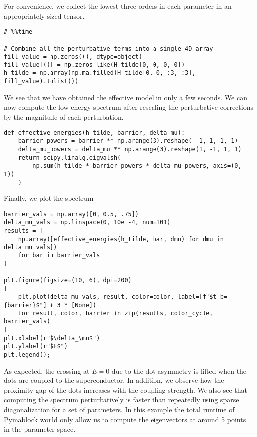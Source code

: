 For convenience, we collect the lowest three orders in each parameter in an
appropriately sized tensor.
%
\begin{verbatim}
# %%time

# Combine all the perturbative terms into a single 4D array
fill_value = np.zeros((), dtype=object)
fill_value[()] = np.zeros_like(H_tilde[0, 0, 0, 0])
h_tilde = np.array(np.ma.filled(H_tilde[0, 0, :3, :3], fill_value).tolist())
\end{verbatim}
%
We see that we have obtained the effective model in only a few seconds.
We can now compute the low energy spectrum after rescaling the perturbative
corrections by the magnitude of each perturbation.
%
\begin{verbatim}
def effective_energies(h_tilde, barrier, delta_mu):
    barrier_powers = barrier ** np.arange(3).reshape( -1, 1, 1, 1)
    delta_mu_powers = delta_mu ** np.arange(3).reshape(1, -1, 1, 1)
    return scipy.linalg.eigvalsh(
        np.sum(h_tilde * barrier_powers * delta_mu_powers, axis=(0, 1))
    )
\end{verbatim}
%
Finally, we plot the spectrum
%
\begin{verbatim}
barrier_vals = np.array([0, 0.5, .75])
delta_mu_vals = np.linspace(0, 10e -4, num=101)
results = [
    np.array([effective_energies(h_tilde, bar, dmu) for dmu in delta_mu_vals])
    for bar in barrier_vals
]

plt.figure(figsize=(10, 6), dpi=200)
[
    plt.plot(delta_mu_vals, result, color=color, label=[f"$t_b={barrier}$"] + 3 * [None])
    for result, color, barrier in zip(results, color_cycle, barrier_vals)
]
plt.xlabel(r"$\delta_\mu$")
plt.ylabel(r"$E$")
plt.legend();
\end{verbatim}
%
%
As expected, the crossing at $E=0$ due to the dot asymmetry is lifted when the
dots are coupled to the superconductor. In addition, we observe how the
proximity gap of the dots increases with the coupling strength.
%
We also see that computing the spectrum perturbatively is faster than
repeatedly using sparse diagonalization for a set of parameters.
In this example the total runtime of Pymablock would only allow us to compute
the  eigenvectors at around 5 points in the parameter space.
